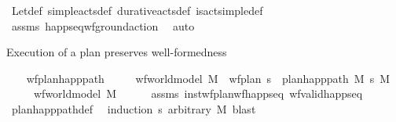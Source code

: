 \begin{isabellebody}
\ Let{\isacharunderscore}{\kern0pt}def\ simple{\isacharunderscore}{\kern0pt}acts{\isacharunderscore}{\kern0pt}def\ durative{\isacharunderscore}{\kern0pt}acts{\isacharunderscore}{\kern0pt}def\ is{\isacharunderscore}{\kern0pt}act{\isacharunderscore}{\kern0pt}simple{\isacharunderscore}{\kern0pt}def\isanewline
\ \ \ \ \isamarkupfalse%
\ assms\ happ{\isacharunderscore}{\kern0pt}seq{\isacharunderscore}{\kern0pt}wf{\isacharunderscore}{\kern0pt}ground{\isacharunderscore}{\kern0pt}action\ \isamarkupfalse%
\ auto%
\endisatagproof
{\isafoldproof}%
%
\isadelimproof
%
\endisadelimproof
%
\begin{isamarkuptext}%
Execution of a plan preserves well-formedness%
\end{isamarkuptext}\isamarkuptrue%
\ \ \isamarkupfalse%
\ wf{\isacharunderscore}{\kern0pt}plan{\isacharunderscore}{\kern0pt}happ{\isacharunderscore}{\kern0pt}path{\isacharcolon}{\kern0pt}\isanewline
\ \ \ \ \ {\isachardoublequoteopen}wf{\isacharunderscore}{\kern0pt}world{\isacharunderscore}{\kern0pt}model\ M{\isachardoublequoteclose}\ \ {\isachardoublequoteopen}wf{\isacharunderscore}{\kern0pt}plan\ {\isasympi}s{\isachardoublequoteclose}\ \ {\isachardoublequoteopen}plan{\isacharunderscore}{\kern0pt}happ{\isacharunderscore}{\kern0pt}path\ M\ {\isasympi}s\ M{\isacharprime}{\kern0pt}{\isachardoublequoteclose}\isanewline
\ \ \ \ \ {\isachardoublequoteopen}wf{\isacharunderscore}{\kern0pt}world{\isacharunderscore}{\kern0pt}model\ M{\isacharprime}{\kern0pt}{\isachardoublequoteclose}\isanewline
%
\isadelimproof
\ \ \ \ %
\endisadelimproof
%
\isatagproof
{}\isamarkupfalse%
\ assms\ inst{\isacharunderscore}{\kern0pt}wf{\isacharunderscore}{\kern0pt}plan{\isacharunderscore}{\kern0pt}wf{\isacharunderscore}{\kern0pt}happ{\isacharunderscore}{\kern0pt}seq\ wf{\isacharunderscore}{\kern0pt}valid{\isacharunderscore}{\kern0pt}happ{\isacharunderscore}{\kern0pt}seq\isanewline
\ \ \ \ \isamarkupfalse%
\ plan{\isacharunderscore}{\kern0pt}happ{\isacharunderscore}{\kern0pt}path{\isacharunderscore}{\kern0pt}def\ \isamarkupfalse%
\ {\isacharparenleft}{\kern0pt}induction\ {\isasympi}s\ arbitrary{\isacharcolon}{\kern0pt}\ M{\isacharparenright}{\kern0pt}\ blast{\isacharplus}{\kern0pt}%
\endisatagproof
{\isafoldproof}%
%
\isadelimproof
\isanewline
%
\endisadelimproof
\isanewline
{}\isamarkupfalse%
\ %
\end{isabellebody}
